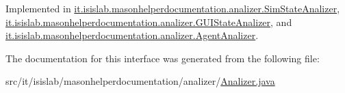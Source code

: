 Implemented in \hyperlink{classit_1_1isislab_1_1masonhelperdocumentation_1_1analizer_1_1_sim_state_analizer_aa91938db714ec7b05134139ce741e61d}{it.\-isislab.\-masonhelperdocumentation.\-analizer.\-Sim\-State\-Analizer}, \hyperlink{classit_1_1isislab_1_1masonhelperdocumentation_1_1analizer_1_1_g_u_i_state_analizer_ade3afe629883da877a73f0a2527c4826}{it.\-isislab.\-masonhelperdocumentation.\-analizer.\-G\-U\-I\-State\-Analizer}, and \hyperlink{classit_1_1isislab_1_1masonhelperdocumentation_1_1analizer_1_1_agent_analizer_aa330ee12112641e1ba3d9acedb9401b9}{it.\-isislab.\-masonhelperdocumentation.\-analizer.\-Agent\-Analizer}.



The documentation for this interface was generated from the following file\-:\begin{DoxyCompactItemize}
\item 
src/it/isislab/masonhelperdocumentation/analizer/\hyperlink{_analizer_8java}{Analizer.\-java}\end{DoxyCompactItemize}
